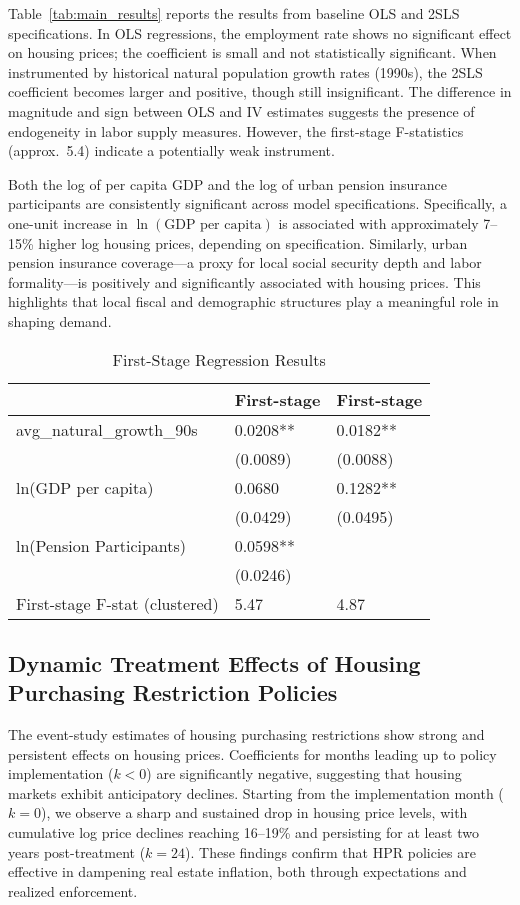 \documentclass[12pt,english]{article}
\begin{document}
	Table~\ref{tab:main_results} reports the results from baseline OLS and 2SLS specifications. In OLS regressions, the employment rate shows no significant effect on housing prices; the coefficient is small and not statistically significant. When instrumented by historical natural population growth rates (1990s), the 2SLS coefficient becomes larger and positive, though still insignificant. The difference in magnitude and sign between OLS and IV estimates suggests the presence of endogeneity in labor supply measures. However, the first-stage F-statistics (approx.~5.4) indicate a potentially weak instrument.
	
	Both the log of per capita GDP and the log of urban pension insurance participants are consistently significant across model specifications. Specifically, a one-unit increase in $\ln(\text{GDP per capita})$ is associated with approximately 7--15\% higher log housing prices, depending on specification. Similarly, urban pension insurance coverage---a proxy for local social security depth and labor formality---is positively and significantly associated with housing prices. This highlights that local fiscal and demographic structures play a meaningful role in shaping demand.
	\begin{table}[H]
		\centering
		\caption{First-Stage Regression Results}
		\label{tab:first_stage}
		\begin{tabular}{lll}
			\toprule
			&       First-stage & First-stage \\
			\midrule
			avg\_natural\_growth\_90s & 0.0208** & 0.0182** \\
			& (0.0089) & (0.0088) \\
			ln(GDP per capita) & 0.0680 & 0.1282** \\
			& (0.0429) & (0.0495) \\
			ln(Pension Participants) & 0.0598** & \\
			& (0.0246) & \\
			First-stage F-stat (clustered) & 5.47 & 4.87 \\
			\bottomrule
		\end{tabular}
	\end{table}
	
	\subsection{Dynamic Treatment Effects of Housing Purchasing Restriction Policies}
	The event-study estimates of housing purchasing restrictions show strong and persistent effects on housing prices. Coefficients for months leading up to policy implementation (\(k < 0\)) are significantly negative, suggesting that housing markets exhibit anticipatory declines. Starting from the implementation month (\(k = 0\)), we observe a sharp and sustained drop in housing price levels, with cumulative log price declines reaching 16--19\% and persisting for at least two years post-treatment (\(k = 24\)). These findings confirm that HPR policies are effective in dampening real estate inflation, both through expectations and realized enforcement.
	
\end{document}
